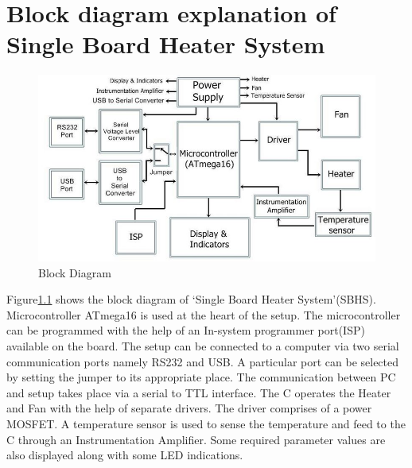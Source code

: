 \documentclass[12pt]{report}
\begin{document}
\chapter{Block diagram explanation of Single Board Heater System}
\begin{figure}
\centering
\includegraphics[width=\linewidth]{blkdiag.jpg}
\caption{Block Diagram}
\label{blkdig}
\end{figure}
Figure\ref{blkdig} shows the block diagram of \textquoteleft Single Board Heater System\textquoteright (SBHS). Microcontroller ATmega16 is used at the heart of the setup. The microcontroller can be programmed with the help of an In-system programmer port(ISP) available on the board. The setup can be connected to a computer via two serial communication ports namely RS232 and USB. A particular port can be selected by setting the jumper to its appropriate place. The communication between PC and setup takes place via a serial to TTL interface. The \textmu C operates the Heater and Fan with the help of separate drivers. The driver comprises of a power MOSFET. A temperature sensor is used to sense the temperature and feed to the \textmu C through an Instrumentation Amplifier. Some required parameter values are also displayed along with some LED indications.
\end{document}
